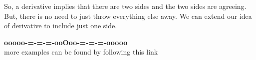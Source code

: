 \documentclass{ximera}
\begin{document}
So, a derivative implies that there are two sides and the two sides are agreeing. \\



But, there is no need to just throw everything else away.  We can extend our idea of derivative to include just one side. \\ 


























\begin{center}
\textbf{\textcolor{green!50!black}{ooooo-=-=-=-ooOoo-=-=-=-ooooo}} \\

more examples can be found by following this link\\ 

\end{center}
\end{document}
